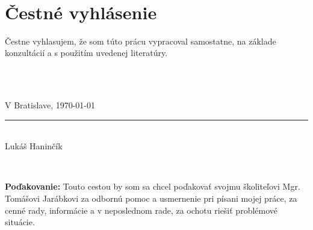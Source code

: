 \documentclass[12pt, twoside]{book}
\begin{document}
\setcounter{page}{3}
\newpage 
~
\section*{Čestné vyhlásenie}
\vfill
Čestne vyhlasujem, že som túto prácu vypracoval samostatne, na základe konzultácií a s použitím uvedenej literatúry.

\parbox{\textwidth}{
    \centering\\
    \vspace{2cm}

    \parbox{7cm}{
      \centering
      \rule{0cm}{1pt}\\
      V Bratislave, \today
    }
    \hfill
    \parbox{7cm}{
      \centering
      \rule{5cm}{1pt}\\
       Lukáš Haninčík 
    }
}
\newpage 
\afterpage{\null\thispagestyle{empty}\newpage}

 
~

\vfill
{\bf Poďakovanie:} Touto cestou by som sa chcel poďakovať svojmu školiteľovi Mgr. Tomášovi Jarábkovi za odbornú pomoc a usmernenie pri písani mojej práce, za cenné rady, informácie a v neposlednom rade, za ochotu riešiť problémové situácie.
\newpage 
\afterpage{\null\thispagestyle{empty}\newpage}


\end{document}
